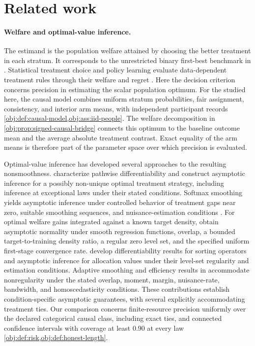 \section{Related work}

\paragraph{Welfare and optimal-value inference.}
The estimand is the population welfare attained by choosing the better treatment in each stratum. It corresponds to the unrestricted binary first-best benchmark in \citet[Section~2, equations~(3)--(7)]{Cerulli2026OptimalPolicy}. Statistical treatment choice and policy learning evaluate data-dependent treatment rules through their welfare and regret \citep{Manski2004,Kitagawa2018,Athey2021}. Here the decision criterion concerns precision in estimating the scalar population optimum. For the  studied here, the causal model combines uniform stratum probabilities, fair assignment, consistency, and interior arm means, with independent participant records \cref{obj:def:causal-model,obj:ass:iid-people}. The welfare decomposition in \cref{obj:prop:signed-causal-bridge} connects this optimum to the baseline outcome mean and the average absolute treatment contrast. Exact equality of the arm means is therefore part of the parameter space over which precision is evaluated.

Optimal-value inference has developed several approaches to the resulting nonsmoothness. \citet{LuedtkeVanDerLaan2016OptimalValue} characterize pathwise differentiability and construct asymptotic inference for a possibly non-unique optimal treatment strategy, including inference at exceptional laws under their stated conditions. Softmax smoothing yields asymptotic inference under controlled behavior of treatment gaps near zero, suitable smoothing sequences, and nuisance-estimation conditions \citep[Theorem~3.3]{WhitehouseChenAusternSyrgkanis2026Softmax}. For optimal welfare gains integrated against a known target density, \citet[Theorem~1, Assumptions~1, 2(b)(c), and~3]{Chen2025} obtain asymptotic normality under smooth regression functions, overlap, a bounded target-to-training density ratio, a regular zero level set, and the specified uniform first-stage convergence rate. \citet[Sections~3.2 and~4]{Feng2026} develop differentiability results for sorting operators and asymptotic inference for allocation values under their level-set regularity and estimation conditions. Adaptive smoothing and efficiency results in \citet[Theorems~2.2 and~3.1, Assumptions~1--8]{Xu2026} accommodate nonregularity under the stated overlap, moment, margin, nuisance-rate, bandwidth, and homoscedasticity conditions. These contributions establish condition-specific asymptotic guarantees, with several explicitly accommodating treatment ties. Our comparison concerns finite-resource precision uniformly over the declared categorical causal class, including exact ties, and connected confidence intervals with coverage at least \(0.90\) at every law \cref{obj:def:risk,obj:def:honest-length}.

